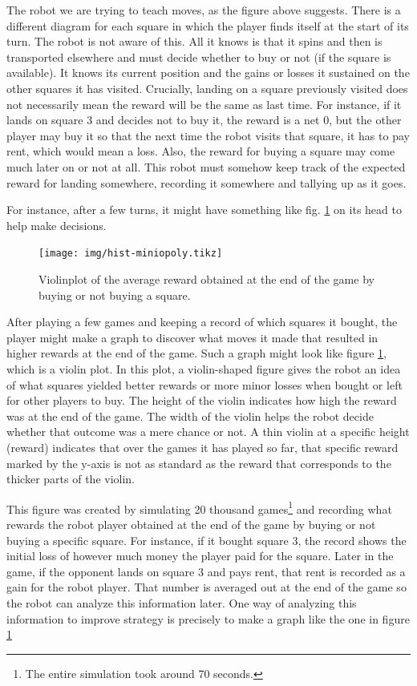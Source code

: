 The robot we are trying to teach moves, as the figure above suggests. There is a
different diagram for each square in which the player finds itself at the start
of its turn. The robot is not aware of this. All it knows is that it spins and
then is transported elsewhere and must decide whether to buy or not (if the
square is available). It knows its current position and the gains or losses it
sustained on the other squares it has visited. Crucially, landing on a square
previously visited does not necessarily mean the reward will be the same as last
time. For instance, if it lands on square 3 and decides not to buy it, the
reward is a net 0, but the other player may buy it so that the next time the
robot visits that square, it has to pay rent, which would mean a loss. Also, the
reward for buying a square may come much later on or not at all. This robot must
somehow keep track of the expected reward for landing somewhere, recording it
somewhere and tallying up as it goes.

For instance, after a few turns, it might have something like fig.
\ref{fig:violinplot} on its head to help make decisions.

\begin{figure}
\centering
\texttt{[image: img/hist-miniopoly.tikz]}
\caption{Violinplot of the average reward obtained at the end 
of the game by buying or not buying a square.}
\label{fig:violinplot}
\end{figure}

After playing a few games and keeping a record of which squares it bought, the
player might make a graph to discover what moves it made that resulted in higher
rewards at the end of the game. Such a graph might look like figure
\ref{fig:violinplot}, which is a violin plot. In this plot, a violin-shaped
figure gives the robot an idea of what squares yielded better rewards or more
minor losses when bought or left for other players to buy. The height of the
violin indicates how high the reward was at the end of the game. The width of
the violin helps the robot decide whether that outcome was a mere chance or not.
A thin violin at a specific height (reward) indicates that over the games it has
played so far, that specific reward marked by the y-axis is not as standard as
the reward that corresponds to the thicker parts of the violin.

This figure was created by simulating 20 thousand games\footnote{The entire
simulation took around 70 seconds.} and recording what rewards the robot player
obtained at the end of the game by buying or not buying a specific square. For
instance, if it bought square 3, the record shows the initial loss of however
much money the player paid for the square. Later in the game, if the opponent
lands on square 3 and pays rent, that rent is recorded as a gain for the robot
player. That number is averaged out at the end of the game so the robot can
analyze this information later. One way of analyzing this information to improve
strategy is precisely to make a graph like the one in figure
\ref{fig:violinplot}

